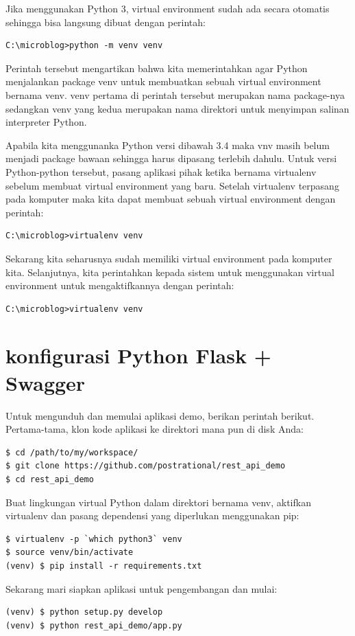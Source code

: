 \documentclass[12pt]{article}
\begin{document}
Jika menggunakan Python 3, virtual environment sudah ada secara otomatis sehingga bisa langsung dibuat dengan perintah:

\begin{verbatim}
C:\microblog>python -m venv venv
\end{verbatim}

Perintah tersebut mengartikan bahwa kita memerintahkan agar Python menjalankan package venv untuk membuatkan sebuah virtual environment bernama venv. venv pertama di perintah tersebut merupakan nama package-nya sedangkan venv yang kedua merupakan nama direktori untuk menyimpan salinan interpreter Python.

Apabila kita menggunanka Python versi dibawah 3.4 maka vnv masih belum menjadi package bawaan sehingga harus dipasang terlebih dahulu. Untuk versi Python-python tersebut, pasang aplikasi pihak ketika bernama virtualenv sebelum membuat virtual environment yang baru. Setelah virtualenv terpasang pada komputer maka kita dapat membuat sebuah virtual environment dengan perintah:

\begin{verbatim}
C:\microblog>virtualenv venv
\end{verbatim}

Sekarang kita seharusnya sudah memiliki virtual environment pada komputer kita. Selanjutnya, kita perintahkan kepada sistem untuk menggunakan virtual environment untuk mengaktifkannya dengan perintah:

\begin{verbatim}
C:\microblog>virtualenv venv
\end{verbatim}



\section{konfigurasi Python Flask + Swagger}
Untuk mengunduh dan memulai aplikasi demo, berikan perintah berikut. Pertama-tama, klon kode aplikasi ke direktori mana pun di disk Anda:
\begin{verbatim}
$ cd /path/to/my/workspace/
$ git clone https://github.com/postrational/rest_api_demo
$ cd rest_api_demo
\end{verbatim}
Buat lingkungan virtual Python dalam direktori bernama venv, aktifkan virtualenv dan pasang dependensi yang diperlukan menggunakan pip:
\begin{verbatim}
$ virtualenv -p `which python3` venv
$ source venv/bin/activate
(venv) $ pip install -r requirements.txt
\end{verbatim}
Sekarang mari siapkan aplikasi untuk pengembangan dan mulai:
\begin{verbatim}
(venv) $ python setup.py develop
(venv) $ python rest_api_demo/app.py
\end{verbatim}
\cite{de2017api}
\end{document}

